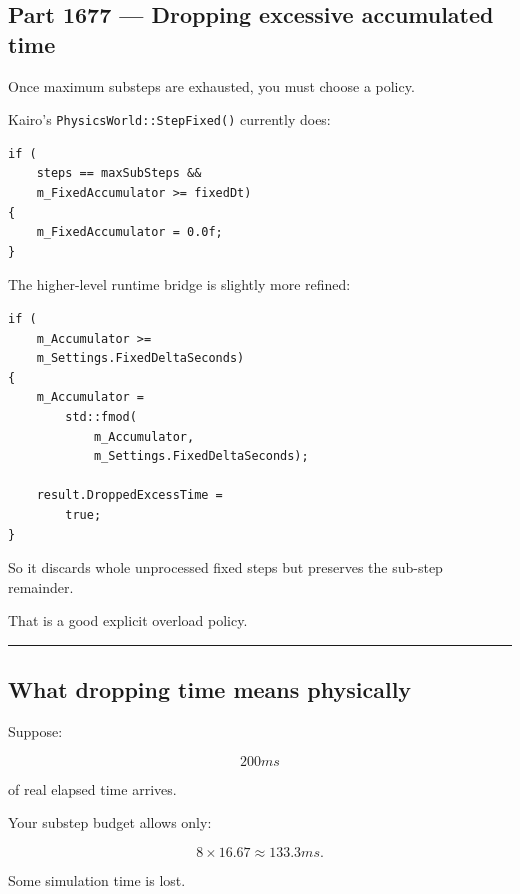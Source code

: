 \subsection{Part 1677 --- Dropping excessive accumulated time}\label{06-engine-ii-ch037-part-1677-dropping-excessive-accumulated-time}

\hypertarget{06-engine-ii-ch037-part-1677-dropping-excessive-accumulated-time}{}

Once maximum substeps are exhausted, you must choose a policy.

Kairo's \texttt{PhysicsWorld::StepFixed()} currently does:

\begin{verbatim}
if (
    steps == maxSubSteps &&
    m_FixedAccumulator >= fixedDt)
{
    m_FixedAccumulator = 0.0f;
}
\end{verbatim}

The higher-level runtime bridge is slightly more refined:

\begin{verbatim}
if (
    m_Accumulator >=
    m_Settings.FixedDeltaSeconds)
{
    m_Accumulator =
        std::fmod(
            m_Accumulator,
            m_Settings.FixedDeltaSeconds);

    result.DroppedExcessTime =
        true;
}
\end{verbatim}

So it discards whole unprocessed fixed steps but preserves the sub-step remainder.

That is a good explicit overload policy.

\begin{center}\rule{0.5\linewidth}{0.5pt}\end{center}

\subsection{What dropping time means physically}\label{06-engine-ii-ch037-what-dropping-time-means-physically}

\hypertarget{06-engine-ii-ch037-what-dropping-time-means-physically}{}

Suppose:

\[
200ms
\]

of real elapsed time arrives.

Your substep budget allows only:

\[
8\times16.67
\approx133.3ms.
\]

Some simulation time is lost.

